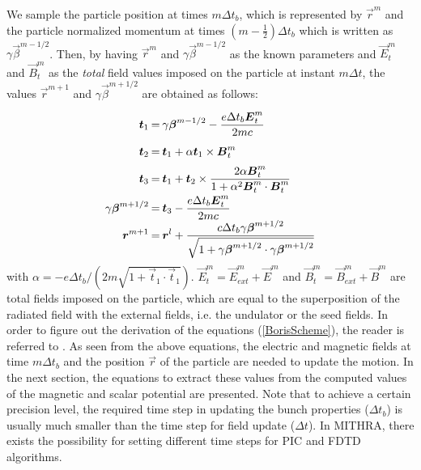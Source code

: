 We sample the particle position at times $m\Delta t_b$, which is represented by $\vec{r}^m$ and the particle normalized momentum at times $(m-\frac{1}{2})\Delta t_b$ which is written as $\gamma \vec{\beta}^{m-1/2}$.
%
Then, by having $\vec{r}^m$ and $\gamma \vec{\beta}^{m-1/2}$ as the known parameters and $\vec{E}^m_t$ and $\vec{B}^m_t$ as the \emph{total} field values imposed on the particle at instant $m\Delta t$, the values $\vec{r}^{m+1}$ and $\gamma \vec{\beta}^{m+1/2}$ are obtained as follows:
%
\begin{equation}
\arraycolsep=1.0pt\def\arraystretch{2.0}
\label{BorisScheme}
\begin{array}{rcl}
\vec{t}_1 & = & \displaystyle \gamma \vec{\beta}^{m-1/2} - \frac{e\Delta t_b \vec{E}^m_t}{2mc} \\
\vec{t}_2 & = & \displaystyle \vec{t}_1 + \alpha \vec{t}_1 \times \vec{B}^m_t \\
\vec{t}_3 & = & \displaystyle \vec{t}_1 + \vec{t}_2 \times \frac{2 \alpha \vec{B}^m_t}{1+\alpha^2 \vec{B}^m_t \cdot \vec{B}^m_t} \\
\gamma \vec{\beta}^{m+1/2} & = & \displaystyle \vec{t}_3 - \frac{e\Delta t_b \vec{E}^m_t}{2mc} \\
\displaystyle \vec{r}^{m+1} & = & \displaystyle \vec{r}^l + \frac{c \Delta t_b \gamma \vec{\beta}^{m+1/2} }{\sqrt{1+\gamma \vec{\beta}^{m+1/2} \cdot \gamma \vec{\beta}^{m+1/2} } }
\end{array}
\end{equation}
%
with $\alpha = -e\Delta t_b / (2 m \sqrt{1+\vec{t}_1 \cdot \vec{t}_1})$.
%
$\vec{E}^m_t = \vec{E}^m_{ext} + \vec{E}^m$ and $\vec{B}^m_t = \vec{B}^m_{ext} + \vec{B}^m$ are total fields imposed on the particle, which are equal to the superposition of the radiated field with the external fields, i.e. the undulator or the seed fields.
%
In order to figure out the derivation of the equations (\ref{BorisScheme}), the reader is referred to \cite{boris1,boris2}.
%
As seen from the above equations, the electric and magnetic fields at time $m \Delta t_b$ and the position $\vec{r}$ of the particle are needed to update the motion.
%
In the next section, the equations to extract these values from the computed values of the magnetic and scalar potential are presented.
%
Note that to achieve a certain precision level, the required time step in updating the bunch properties ($\Delta t_b$) is usually much smaller than the time step for field update ($\Delta t$).
%
In MITHRA, there exists the possibility for setting different time steps for PIC and FDTD algorithms.

